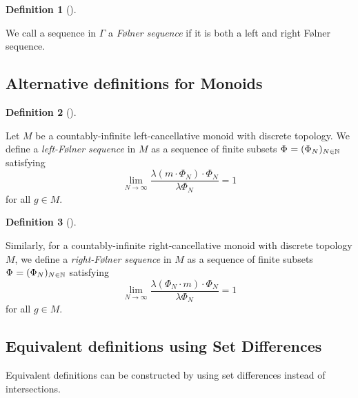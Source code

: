 \documentclass[
  british,
]{article}
\theoremstyle{plain}
\theoremstyle{definition}
\newtheorem{definition}{Definition}[section]
\theoremstyle{remark}
\newcommand{\Folner}[1][\vphantom{}]{{\Phi}_{#1}}
\newcommand{\CountingMeasure}{{\lambda}}
\newcommand{\Group}{{\Gamma}}
\newcommand{\Monoid}{{M}}
\newcommand{\MonoidOperation}[2]{{#1}\cdot{#2}}
\newcommand{\MonoidElement}{{m}}
\begin{document}
\begin{definition}[]\protect\hypertarget{def-Folner}{}\label{def-Folner}

We call a sequence in \(\Group\) a \emph{Følner sequence} if it is both
a left and right Følner sequence.

\end{definition}

\subsection{Alternative definitions for
Monoids}\label{alternative-definitions-for-monoids}

\begin{definition}[]\protect\hypertarget{def-rightFolnerMonoid}{}\label{def-rightFolnerMonoid}

Let \(\Monoid\) be a countably-infinite left-cancellative monoid with
discrete topology. We define a \emph{left-Følner sequence} in
\(\Monoid\) as a sequence of finite subsets
\(\Folner =(\Folner[N])_{N\in\mathbb{N}}\) satisfying
\[\lim_{N\rightarrow\infty}\frac{\CountingMeasure{\MonoidOperation{(\MonoidOperation{\MonoidElement}{\Folner[N]})}{\Folner[N]}}}{\CountingMeasure{\Folner[N]}}=1\]
for all \(g\in M\).

\end{definition}

\begin{definition}[]\protect\hypertarget{def-leftFolnerMonoid}{}\label{def-leftFolnerMonoid}

Similarly, for a countably-infinite right-cancellative monoid with
discrete topology \(\Monoid\), we define a \emph{right-Følner sequence}
in \(\Monoid\) as a sequence of finite subsets
\(\Folner =(\Folner[N])_{N\in\mathbb{N}}\) satisfying
\[\lim_{N\rightarrow\infty}\frac{\CountingMeasure{\MonoidOperation{(\MonoidOperation{\Folner[N]}{\MonoidElement})}{\Folner[N]}}}{\CountingMeasure{\Folner[N]}}=1\]
for all \(g\in M\).

\end{definition}

\subsection{Equivalent definitions using Set
Differences}\label{equivalent-definitions-using-set-differences}

Equivalent definitions can be constructed by using set differences
instead of intersections.
\end{document}
